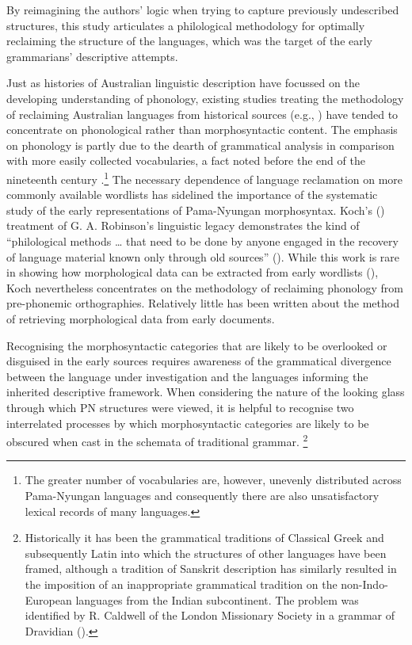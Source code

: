 By reimagining the authors' logic when trying to capture previously undescribed structures, this study articulates a philological methodology for optimally reclaiming the structure of the languages, which was the target of the early grammarians' descriptive attempts. 

Just as histories of Australian linguistic description have focussed on the developing understanding of phonology, existing studies treating the methodology of reclaiming Australian languages from historical sources (e.g., \citealt{thieberger_paper_1995}) have tended to concentrate on phonological rather than morphosyntactic content. The emphasis on phonology is partly due to the dearth of grammatical analysis in comparison with more easily collected vocabularies, a fact noted before the end of the nineteenth century \citep[xvi]{fraser_australian_1892}.\footnote{ The greater number of vocabularies are, however, unevenly distributed across Pama-Nyungan languages and consequently there are also unsatisfactory lexical records of many languages.}  The necessary dependence of language reclamation on more commonly available wordlists has sidelined the importance of the systematic study of the early representations of Pama-Nyungan morphosyntax. Koch’s (\citeyear{koch_george_2011}) treatment of G. A. Robinson’s linguistic legacy demonstrates the kind of “philological methods … that need to be done by anyone engaged in the recovery of language material known only through old sources” (\citealt[141]{koch_george_2011}). While this work is rare in showing how morphological data can be extracted from early wordlists (\citealt[157]{koch_george_2011}), Koch nevertheless concentrates on the methodology of reclaiming phonology from pre-phonemic orthographies. Relatively little has been written about the method of retrieving morphological data from early documents.

Recognising the morphosyntactic categories that are likely to be overlooked or disguised in the early sources requires awareness of the grammatical divergence between the language under investigation and the languages informing the inherited descriptive framework. When considering the nature of the looking glass through which PN structures were viewed, it is helpful to recognise two interrelated processes by which morphosyntactic categories are likely to be obscured when cast in the schemata of traditional grammar. \footnote{ Historically it has been the grammatical traditions of Classical Greek and subsequently Latin into which the structures of other languages have been framed, although a tradition of Sanskrit description has similarly resulted in the imposition of an inappropriate grammatical tradition on the non-Indo-European languages from the Indian subcontinent. The problem was identified by R. Caldwell of the London Missionary Society in a grammar of Dravidian (\citealt[203]{caldwell_1861}).}   

